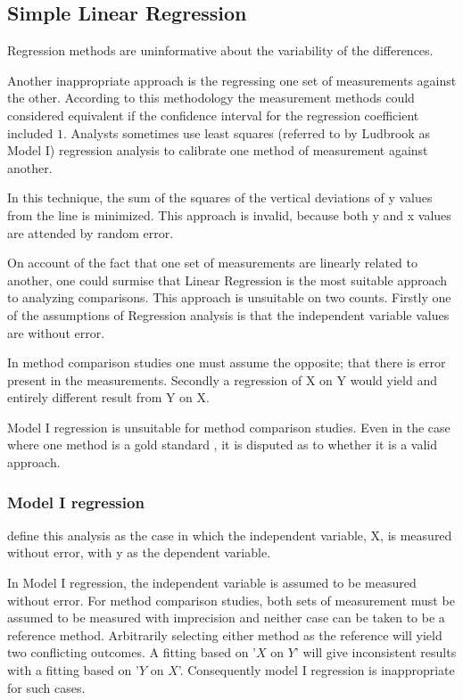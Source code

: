 \documentclass[12pt, a4paper]{report}
\theoremstyle{plain}
\theoremstyle{definition}
\theoremstyle{remark}
\begin{document}
	\subsection{Simple Linear Regression}
	
	Regression methods are uninformative about the variability of the differences.
	
	Another inappropriate approach is the regressing one set of measurements against the other. According to this methodology the measurement methods could considered equivalent if the confidence interval for the regression coefficient included $1$. Analysts sometimes use least squares (referred to by Ludbrook as Model I) regression analysis to calibrate one method of measurement against another.
	
	 In this technique, the sum of the squares of the vertical deviations of y values from the line is minimized. This approach is invalid, because both y and x values are attended by random error.
	
		On account of the fact that one set of measurements are linearly related to another, one could surmise that Linear Regression is the most suitable approach to analyzing comparisons. This approach is unsuitable on two counts. Firstly one of the assumptions of Regression analysis is that the independent variable values are without error. 
		
		In method comparison studies one must assume the opposite; that there is error present in the measurements. Secondly a regression of X on Y would yield and entirely different result from Y on X.
		
		Model I regression is unsuitable for method comparison studies. Even in the case where one method is a gold standard , it is disputed as to whether it is a valid approach. 
	\subsubsection{Model I regression}
	\citet{CornCoch} define this analysis as the case in which the independent variable, X, is measured without error, with y as the dependent variable.
	
	
	In Model I regression, the independent variable is assumed to be
	measured without error. For method comparison studies, both sets of measurement must be assumed to be measured with imprecision and neither case can be taken to be a reference method. Arbitrarily
	selecting either method as the reference will yield two conflicting outcomes. A fitting based on '$X$ on $Y$' will give inconsistent results with a fitting based on '$Y$ on $X$'. Consequently model I regression is inappropriate for such cases.
	
\end{document}
